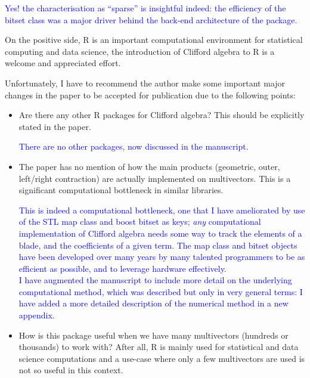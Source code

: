 \documentclass{article}
\begin{document}
\textcolor{blue}{Yes! the characterisation as ``sparse'' is insightful
  indeed: the efficiency of the bitset class was a major driver behind
  the back-end architecture of the package.}

On the positive side, R is an important computational environment for
statistical computing and data science, the introduction of Clifford
algebra to R is a welcome and appreciated effort.

Unfortunately, I have to recommend the author make some important
major changes in the paper to be accepted for publication due to the
following points:

\begin{itemize}
  \item Are there any other R packages for Clifford algebra? This
    should be explicitly stated in the paper.

    \textcolor{blue}{There are no other packages, now discussed in the
      manuscript.}
  \item The paper has no mention of how the main products (geometric,
    outer, left/right contraction) are actually implemented on
    multivectors. This is a significant computational bottleneck in
    similar libraries.

    \textcolor{blue}{This is indeed a computational bottleneck, one
      that I have ameliorated by use of the STL map class and boost
      bitset as keys; {\em any} computational implementation of
      Clifford algebra needs some way to track the elements of a
      blade, and the coefficients of a given term.  The map class and
      bitset objects have been developed over many years by many
      talented programmers to be as efficient as possible, and to
      leverage hardware effectively.\\ I have augmented the manuscript
      to include more detail on the underlying computational method,
      which was described but only in very general terms: I have added
      a more detailed description of the numerical method in a new
      appendix.}

\item How is this package useful when we have many multivectors
  (hundreds or thousands) to work with? After all, R is mainly used
  for statistical and data science computations and a use-case where
  only a few multivectors are used is not so useful in this context.


\end{itemize}
\end{document}
